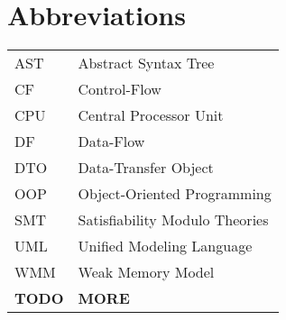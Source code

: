 \chapter*{Abbreviations}


\noindent
\begin{longtable}{@{}p{}p{}@{}}
AST & Abstract Syntax Tree \\
CF  & Control-Flow \\
CPU & Central Processor Unit \\
DF  & Data-Flow \\
DTO & Data-Transfer Object \\
OOP & Object-Oriented Programming \\
SMT & Satisfiability Modulo Theories \\
UML & Unified Modeling Language \\ %
WMM & Weak Memory Model \\
\textbf{TODO} & \textbf{MORE}
\end{longtable}


